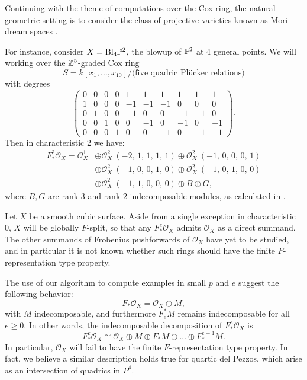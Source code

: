 \documentclass{article}
\def\O{\mathcal O}
\numberwithin{equation}{section}
\theoremstyle{theorem}
\numberwithin{thm}{section}
\theoremstyle{definition}
\begin{document}
\begin{exa}
  Continuing with the theme of computations over the Cox ring, the natural geometric setting is to consider the class of projective varieties known as Mori dream spaces \cite{HuKeel00}.

  For instance, consider $X = \mathrm{Bl}_4\P^2$, the blowup of $\P^2$ at 4 general points. We will working over the $\Z^5$-graded Cox ring
  \[ S = k[x_1,\dots,x_{10}]/\text{(five quadric Pl\"ucker relations)} \]
  with degrees
    \[
    \left(\!\begin{array}{rrrrrrrrrr}
      0&0&0&0&1&1&1&1&1&1 \\
      1&0&0&0&-1&-1&-1&0&0&0 \\
      0&1&0&0&-1&0&0&-1&-1&0 \\
      0&0&1&0&0&-1&0&-1&0&-1 \\
      0&0&0&1&0&0&-1&0&-1&-1
    \end{array}\!\right).
    \]
    Then in characteristic 2 we have:
    \begin{align*}
      F_*^2\O_X = {\O_{X}^{1}}
      &\oplus {\O_{X}^{2}\ \left(-2,\,1,\,1,\,1,\,1\right)} \oplus {\O_{X}^{2}\ \left(-1,\,0,\,0,\,0,\,1\right)} \\
      &\oplus {\O_{X}^{2}\ \left(-1,\,0,\,0,\,1,\,0\right)} \oplus {\O_{X}^{2}\ \left(-1,\,0,\,1,\,0,\,0\right)} \\
      &\oplus {\O_{X}^{2}\ \left(-1,\,1,\,0,\,0,\,0\right)} \oplus B \oplus G,
    \end{align*}
    where $B, G$ are rank-3 and rank-2 indecomposable modules, as calculated in \cite{Hara15}.
\end{exa}

\begin{exa}
  Let $X$ be a smooth cubic surface. Aside from a single exception in characteristic 0, $X$ will be globally $F$-split, so that any $F^e_*\O_X $ admits $\O_X$ as a direct summand.
  The other summands of Frobenius pushforwards of $\O_X$ have yet to be studied, and in particular it is not known whether such rings should have the finite $F$-representation type property.

  The use of our algorithm to compute examples in small $p$ and $e$ suggest the following behavior: 
  $$ F_* \O_X = \O_X\oplus M, $$
  with $M$ indecomposable, and furthermore $F^*_e M$ remains indecomposable for all $e\geq 0$. In other words, the indecomposable decomposition of $F^e_* \O_X$ is 
  $$ F_*^e \O_X \cong \O_X\oplus M\oplus F_* M\oplus\dots\oplus F_*^{e-1}M. $$
  In particular, $\O_X$ will fail to have the finite $F$-representation type property.
  In fact, we believe a similar description holds true for quartic del Pezzos, which arise as an intersection of quadrics in $P^4$.
\end{exa}
\end{document}
